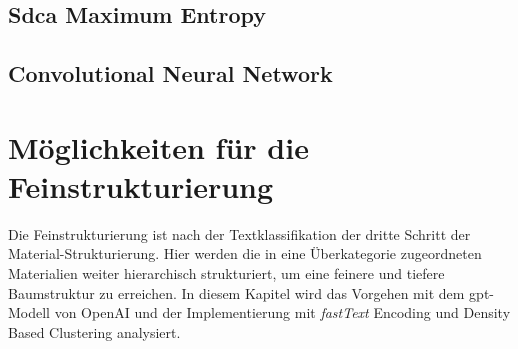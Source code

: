 \subsection{Sdca Maximum Entropy}
\label{c:conception:classification:sdca}

\subsection{Convolutional Neural Network}
\label{c:conception:classification:cnn}


\section{Möglichkeiten für die Feinstrukturierung}
\label{c:conception:fine-structuring}
Die Feinstrukturierung ist nach der Textklassifikation der dritte Schritt der Material-Strukturierung. Hier werden die in eine Überkategorie zugeordneten Materialien weiter hierarchisch strukturiert, um eine feinere und tiefere Baumstruktur zu erreichen. In diesem Kapitel wird das Vorgehen mit dem \ac{gpt}-Modell von OpenAI und der Implementierung mit \textit{fastText} Encoding und Density Based Clustering analysiert.

